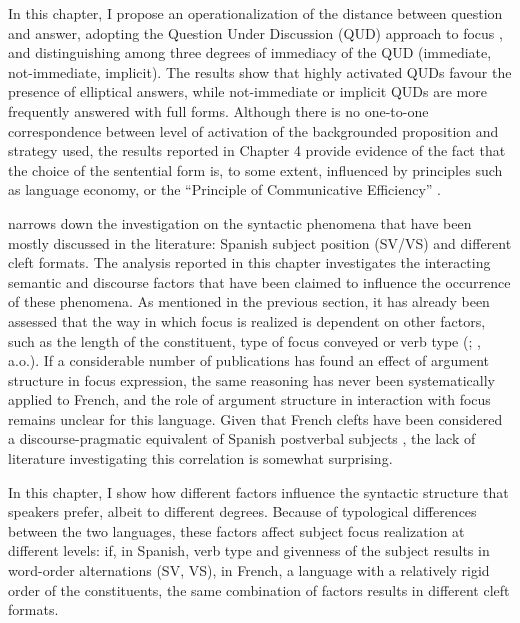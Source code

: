In this chapter, I propose an operationalization of the distance between question and answer, adopting the Question Under Discussion (QUD) approach to focus \parencite{roberts1996information, buring2003d, beaver2009sense, riester2018annotation}, and distinguishing among three degrees of immediacy of the QUD (immediate, not-immediate, implicit). The results show that highly activated QUDs favour the presence of elliptical answers, while not-immediate or implicit QUDs are more frequently answered with full forms. Although there is no one-to-one correspondence between level of activation of the backgrounded proposition and strategy used, the results reported in Chapter 4 provide evidence of the fact that the choice of the sentential form is, to some extent, influenced by principles such as language economy, or the ``Principle of Communicative Efficiency” \parencite[30]{Levshina_2022}.

\textsc{} narrows down the investigation on the syntactic phenomena that have been mostly discussed in the literature: Spanish subject position (SV/VS) and different cleft formats. The analysis reported in this chapter investigates the interacting semantic and discourse factors that have been claimed to influence the occurrence of these phenomena. As mentioned in the previous section, it has already been assessed that the way in which focus is realized is dependent on other factors, such as the length of the constituent, type of focus conveyed or verb type (\cite{gutierrez2013structural}; \cite{gabriel2007fokus}, a.o.). If a considerable number of publications has found an effect of argument structure in focus expression, the same reasoning has never been systematically applied to French, and the role of argument structure in interaction with focus remains unclear for this language. Given that French clefts have been  considered a discourse-pragmatic equivalent of Spanish postverbal subjects \parencite{lambrecht1996information, lambrecht2010constraints, belletti2008answering, lahousse2012word}, the lack of literature investigating this correlation is somewhat surprising.

In this chapter, I show how different factors influence the syntactic structure that speakers prefer, albeit to different degrees. Because of typological differences between the two languages, these factors affect subject focus realization at different levels: if, in Spanish, verb type and givenness of the subject results in word-order alternations (SV, VS), in French, a language with a relatively rigid order of the constituents, the same combination of factors results in different cleft formats.

